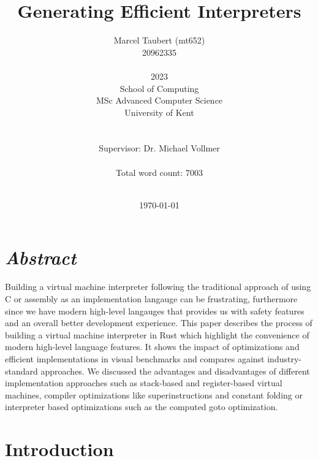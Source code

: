 \documentclass{article}
\title{Generating Efficient Interpreters}
\author{
    Marcel Taubert  (mt652)\\
    20962335        \\
    \\
    2023\\
    School of Computing \\
    MSc Advanced Computer Science\\
    University of Kent \\
    \\\\
    Supervisor: Dr. Michael Vollmer
    \\\\
    Total word count: 7003
    \\\\
}
\date{\today}
\begin{document}
\maketitle
\clearpage

\clearpage
\tableofcontents
\clearpage

\section*{\textit{Abstract}}
Building a virtual machine interpreter following the traditional approach of
using C or assembly as an implementation langauge can be frustrating,
furthermore since we have modern high-level langauges that provides us with
safety features and an overall better development experience. This paper
describes the process of building a virtual machine interpreter in Rust which
highlight the convenience of modern high-level language features. It shows the
impact of optimizations and efficient implementations in visual benchmarks and
compares against industry-standard approaches. We discussed the advantages and
disadvantages of different implementation approaches such as stack-based and
register-based virtual machines, compiler optimizations like superinstructions
and constant folding or interpreter based optimizations such as the computed goto
optimization.

\clearpage
\section{Introduction}

\end{document}
